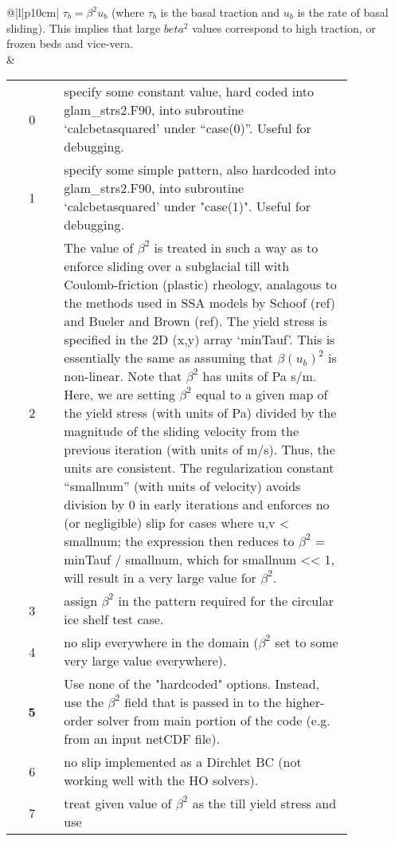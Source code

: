 \begin{center}
\begin{supertabular*}{\textwidth}{@{\extracolsep{\fill}}|l|p{10cm}|}
     $\tau_b = \beta^2  u_b$ (where $\tau_b$ is the basal traction and $u_b$ is
     the rate of basal sliding). This implies that large $beta^2$ values
     correspond to high traction, or frozen beds and vice-vera.\\ &
    \begin{tabular}[t]{cp{0.85\linewidth}}
      0 & specify some constant value, hard coded into glam\_strs2.F90, into
          subroutine `calcbetasquared' under ``case(0)''. Useful for debugging.\\
      1 & specify some simple pattern, also hardcoded into glam\_strs2.F90,
          into subroutine `calcbetasquared' under "case(1)". Useful for
          debugging. \\
      2 & The value of $\beta^2$ is treated in such a way as to enforce
          sliding over a subglacial till with Coulomb-friction (plastic)
          rheology, analagous to the methods used in SSA models by Schoof (ref)
          and Bueler and Brown (ref). The yield stress is specified in the 2D
          (x,y) array `minTauf'. This is essentially the same as assuming that
          $\beta(u_b)^2$ is non-linear. Note that $\beta^2$ has units of Pa s/m.
          Here, we are setting $\beta^2$ equal to a given map of the yield
          stress (with units of Pa) divided by the magnitude of the sliding
          velocity from the previous iteration (with units of m/s). Thus, the
          units are consistent. The regularization constant ``smallnum'' (with
          units of velocity) avoids division by 0 in early iterations and
          enforces no (or negligible) slip for cases where u,v < smallnum; the
          expression then reduces to $\beta^2$ = minTauf / smallnum, which for
          smallnum << 1, will result in a very large value for $\beta^2$.\\
      3 & assign $\beta^2$ in the pattern required for the circular ice
          shelf test case.\\
      4 & no slip everywhere in the domain ($\beta^2$ set to some very large value everywhere).\\
      {\bf 5} & Use none of the "hardcoded" options. Instead, use the $\beta^2$
          field that is passed in to the higher-order solver from main portion
          of the code (e.g. from an input netCDF file).\\
       6 & no slip implemented as a Dirchlet BC (not working well with the HO
       solvers). \\
       7 & treat given value of $\beta^2$ as the till yield stress and use

\end{tabular}
\end{supertabular*}
\end{center}
